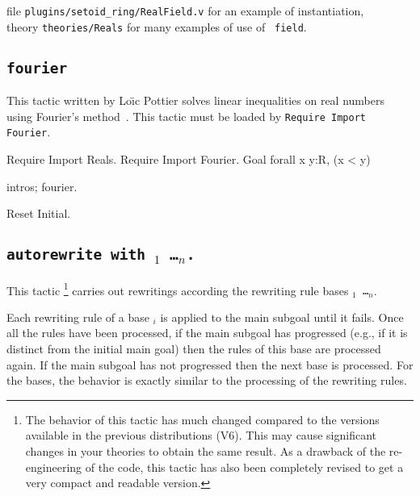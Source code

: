 \SeeAlso file {\tt plugins/setoid\_ring/RealField.v} for an example of instantiation,\\
\phantom{\SeeAlso}theory {\tt theories/Reals} for many examples of use of {\tt
field}.

\subsection{\tt fourier
}

This tactic written by Lo{\"\i}c Pottier solves linear inequalities on
real numbers using Fourier's method~\cite{Fourier}. This tactic must
be loaded by {\tt Require Import Fourier}.

\Example
\begin{coq_example*}
Require Import Reals.
Require Import Fourier.
Goal forall x y:R, (x < y)%
\end{coq_example*}

\begin{coq_example}
intros; fourier.
\end{coq_example}

\begin{coq_eval}
Reset Initial.
\end{coq_eval}

\subsection{\tt autorewrite with \ident$_1$ \dots \ident$_n$.
\label{tactic:autorewrite}
}

This tactic \footnote{The behavior of this tactic has much changed compared to
the versions available in the previous distributions (V6). This may cause
significant changes in your theories to obtain the same result. As a drawback
of the re-engineering of the code, this tactic has also been completely revised
to get a very compact and readable version.} carries out rewritings according
the rewriting rule bases {\tt \ident$_1$ \dots \ident$_n$}.

Each rewriting rule of a base \ident$_i$ is applied to the main subgoal until
it fails. Once all the rules have been processed, if the main subgoal has
progressed (e.g., if it is distinct from the initial main goal) then the rules
of this base are processed again. If the main subgoal has not progressed then
the next base is processed. For the bases, the behavior is exactly similar to
the processing of the rewriting rules.

